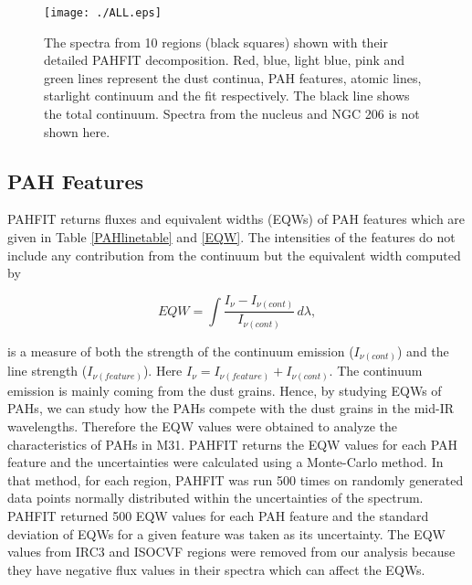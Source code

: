 \documentclass[useAMS,usenatbib,a4paper]{mn2e}
\begin{document}
\begin{figure}
\centering
\texttt{[image: ./ALL.eps]}
  \caption{The spectra from 10 regions (black squares) shown with their detailed PAHFIT decomposition. Red, blue, light blue, pink and green lines represent the dust continua, PAH features, atomic lines, starlight continuum and the fit respectively. The black line shows the total continuum. Spectra from the nucleus and NGC 206 is not shown here.}
\label{PAHFITplots}
\end{figure}


\subsection{PAH Features}

PAHFIT returns fluxes and equivalent widths (EQWs) of PAH features which are given in Table \ref{PAHlinetable} and \ref{EQW}. The intensities of the features do not include any contribution from the continuum but the equivalent width computed by


\begin{equation}
EQW=\int \frac{I_{\nu} - I_{\nu(cont)}}{I_{\nu(cont)}} \,d\lambda,
\end{equation}

is a measure of both the strength of the continuum emission (\(I_{\nu(cont)} \)) and the line strength (\(I_{\nu(feature)}\)). Here \(I_{\nu} = I_{\nu(feature)} + I_{\nu(cont)}\). The continuum emission is mainly coming from the dust grains. Hence, by studying EQWs of PAHs, we can study how the PAHs compete with the dust grains in the mid-IR wavelengths. Therefore the EQW values were obtained to analyze the characteristics of PAHs in M31. PAHFIT returns the EQW values for each PAH feature and the uncertainties were calculated using a Monte-Carlo method. In that method, for each region, PAHFIT was run 500 times on randomly generated data points  normally distributed within the uncertainties of the spectrum. PAHFIT returned 500 EQW values for each PAH feature and the standard deviation of EQWs for a given feature was taken as its uncertainty. 
The EQW values from IRC3 and ISOCVF regions were removed from our analysis because they have negative flux values in their spectra which can affect the EQWs. 
\end{document}
